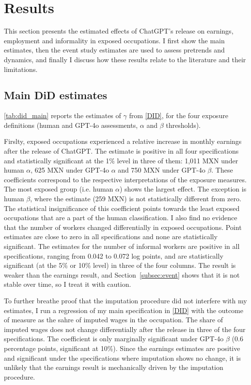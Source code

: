 
\section{Results}\label{sec:results}

This section presents the estimated effects of ChatGPT's release on earnings, employment and informality in exposed occupations. I first show the main  estimates, then the event study estimates are used to assess pretrends and dynamics, and finally I discuss how these results relate to the literature and their limitations.

\subsection{Main DiD estimates}\label{subsec:did}

\cref{tab:did_main} reports the estimates of $\gamma$ from \cref{DID}, for the four exposure definitions (human and GPT-4o assessments, $\alpha$ and $\beta$ thresholds).

Firslty, exposed occupations experienced a relative increase in monthly earnings after the release of ChatGPT. The estimate is positive in all four specifications and statistically significant at the 1\% level in three of them: 1{,}011 MXN under human $\alpha$, 625 MXN under GPT-4o $\alpha$ and 750 MXN under GPT-4o $\beta$. These coefficients correspond to the respective interpretations of the exposure measures. The most exposed group (i.e. human $\alpha$) shows the largest effect. The exception is human $\beta$, where the estimate (259 MXN) is not statistically different from zero. The statistical insignificance of this coefficient points towards the least exposed occupations that are a part of the human classification. I also find no evidence that the number of workers changed differentially in exposed occupations. Point estimates are close to zero in all specifications and none are statistically significant. The estimates for the number of informal workers are positive in all specifications, ranging from 0.042 to 0.072 log points, and are statistically significant (at the 5\% or 10\% level) in three of the four columns. The result is weaker than the earnings result, and Section~\ref{subsec:event} shows that it is not stable over time, so I treat it with caution.

To further breathe proof that the imputation procedure did not interfere with my estimates, I run a regression of my main specification in \cref{DID} with the outcome of measure as the sahre of imputed wages in the occupation. The share of imputed wages does not change differentially after the release in three of the four specifications. The coefficient is only marginally significant under GPT-4o $\beta$ (0.6 percentage points, significant at 10\%). Since the earnings estimates are positive and significant under the specifications where imputation shows no change, it is unlikely that the earnings result is mechanically driven by the imputation procedure.

